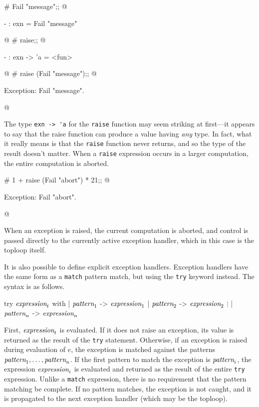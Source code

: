 \begin{ocaml}
# Fail "message";;
@
\begin{topoutput}
- : exn = Fail "message"
\end{topoutput}
@
# raise;;
@
\begin{topoutput}
- : exn -> 'a = <fun>
\end{topoutput}
@
# raise (Fail "message");;
@
\begin{topoutput}
Exception: Fail "message".
\end{topoutput}
@
\end{ocaml}
%
The type \hbox{\lstinline/exn -> 'a/} for the \hbox{\lstinline/raise/} function may seem striking at first---it
appears to say that the raise function can produce a value having \emph{any} type.  In fact, what it
really means is that the \hbox{\lstinline/raise/} function never returns, and so the type of the result
doesn't matter.  When a \hbox{\lstinline/raise/} expression occurs in a larger computation, the entire
computation is aborted.

\begin{ocaml}
# 1 + raise (Fail "abort") * 21;;
@
\begin{topoutput}
Exception: Fail "abort".
\end{topoutput}
@
\end{ocaml}
%
When an exception is raised, the current computation is aborted, and control is passed directly to
the currently active exception handler, which in this case is the toploop itself.

It is also possible to define explicit exception handlers.  Exception handlers have the same form as
a \hbox{\lstinline/match/} pattern match, but using the \hbox{\lstinline/try/} keyword instead.  The syntax is as follows.

\label{keyword:try}
\begin{ocaml}
try $\textit{\rmfamily expression}_t$ with
 | $\textit{\rmfamily pattern}_1$ -> $\textit{\rmfamily expression}_1$
 | $\textit{\rmfamily pattern}_2$ -> $\textit{\rmfamily expression}_2$
 $\vdots$
 | $\textit{\rmfamily pattern}_n$ -> $\textit{\rmfamily expression}_n$
\end{ocaml}
%
First, $\textit{\rmfamily expression}_t$ is evaluated.  If it does not raise an exception, its value is returned
as the result of the \hbox{\lstinline/try/} statement.  Otherwise, if an exception is raised during
evaluation of $e$, the exception is matched against the patterns
$\textit{\rmfamily pattern}_1, \ldots, \textit{\rmfamily pattern}_n$.  If the first pattern to match the exception is
$\textit{\rmfamily pattern}_i$, the expression $\textit{\rmfamily expression}_i$ is evaluated and returned as the result of the
entire \hbox{\lstinline/try/} expression.  Unlike a \hbox{\lstinline/match/} expression, there is no requirement
that the pattern matching be complete.  If no pattern matches, the exception is not caught, and it
is propagated to the next exception handler (which may be the toploop).

